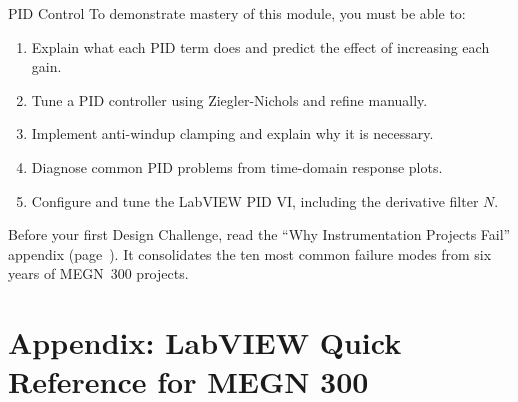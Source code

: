 \documentclass[11pt,letterpaper,twoside,openany]{book}
\begin{document}

\backmatter



\begin{masterycheckbox}{PID Control}
To demonstrate mastery of this module, you must be able to:
\begin{enumerate}[nosep,leftmargin=1.5em]
\item Explain what each PID term does and predict the effect of increasing each gain.
\item Tune a PID controller using Ziegler-Nichols and refine manually.
\item Implement anti-windup clamping and explain why it is necessary.
\item Diagnose common PID problems from time-domain response plots.
\item Configure and tune the LabVIEW PID VI, including the derivative filter $N$.
\end{enumerate}
\end{masterycheckbox}

\begin{tipbox}
Before your first Design Challenge, read the ``Why Instrumentation Projects Fail'' appendix (page~\pageref{ch:projects_fail}). It consolidates the ten most common failure modes from six years of MEGN~300 projects.
\end{tipbox}

\chapter*{Appendix: LabVIEW Quick Reference for MEGN 300}
\end{document}
